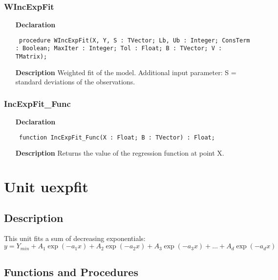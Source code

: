 \documentclass[12pt,a4paper,oneside]{report}
\newcommand{\declarationitem}[1]{\textbf{#1}}
\newcommand{\descriptiontitle}[1]{\textbf{#1}}
\newcommand{\code}[1]{\texttt{#1}}
\begin{document}
\subsubsection{WIncExpFit}
\label{uiexpfit-WIncExpFit}
\begin{itemize}\item[\declarationitem{Declaration}\hfill]
	\begin{flushleft}
		\code{
			procedure WIncExpFit(X, Y, S : TVector; Lb, Ub : Integer; ConsTerm : Boolean; MaxIter : Integer; Tol : Float; B : TVector; V : TMatrix);}
		
	\end{flushleft}
	
	\par
	\item[\descriptiontitle{Description}]
	Weighted fit of the model. Additional input parameter: S = standard deviations of the observations.
	
\end{itemize}
\subsubsection{IncExpFit{\_}Func}
\label{uiexpfit-IncExpFit_Func}
\begin{itemize}\item[\declarationitem{Declaration}\hfill]
	\begin{flushleft}
		\code{
			function IncExpFit{\_}Func(X : Float; B : TVector) : Float;}
		
	\end{flushleft}
	
	\par
	\item[\descriptiontitle{Description}]
	Returns the value of the regression function at point X.
	
\end{itemize}

\section{Unit uexpfit}
\label{uexpfit}
\subsection{Description}
This unit fits a sum of decreasing exponentials: 
$$y = Y_{min} + A_1 \exp(-a_1 x) + A_2 \exp(-a_2 x) + A_3 \exp(-a_3 x) + \dots+A_d \exp(-a_d x)$$ 
\subsection{Functions and Procedures}
\end{document}

